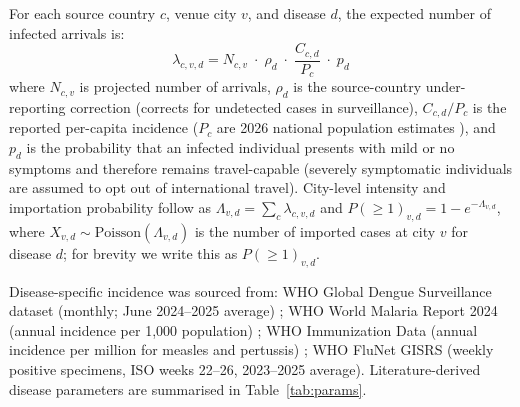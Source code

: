 \documentclass[12pt, a4paper]{article}
\begin{document}
For each source country $c$, venue city $v$, and disease $d$, the expected number of infected arrivals is:
\[
  \lambda_{c,v,d}
    = N_{c,v} \;\cdot\; \rho_d \;\cdot\; \frac{C_{c,d}}{P_c}
               \;\cdot\; p_d
\]
where $N_{c,v}$ is projected number of arrivals, $\rho_d$ is the source-country under-reporting correction (corrects for undetected cases in surveillance), $C_{c,d}/P_c$ is the reported per-capita incidence ($P_c$ are 2026 national population estimates \citep{Worldometers2026pop}), and $p_d$ is the probability that an infected individual presents with mild or no symptoms and therefore remains travel-capable (severely symptomatic individuals are assumed to opt out of international travel). City-level intensity and importation probability follow as $\Lambda_{v,d} = \sum_c \lambda_{c,v,d}$ and $P(\geq 1)_{v,d} = 1 - e^{-\Lambda_{v,d}}$, where $X_{v,d} \sim \mathrm{Poisson}(\Lambda_{v,d})$ is the number of imported cases at city $v$ for disease $d$; for brevity we write this as $P(\geq 1)_{v,d}$.

Disease-specific incidence was sourced from: WHO Global Dengue Surveillance dataset (monthly; June 2024--2025 average) \citep{WHO_dengue}; WHO World Malaria Report 2024 (annual incidence per 1,000 population) \citep{whoWMR2024}; WHO Immunization Data (annual incidence per million for measles and pertussis) \citep{WHO_immunization}; WHO FluNet GISRS (weekly positive specimens, ISO weeks 22--26, 2023--2025 average). Literature-derived disease parameters are summarised in Table~\ref{tab:params}.
\end{document}
